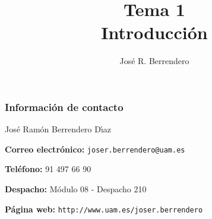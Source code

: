 \documentclass{beamer}
\title[Estad\'{\i}stica: Tema 1]{Tema 1\\
 Introducción}
\author[Berrendero]
{Jos\'{e} R. Berrendero}
\date{}
\institute{Departamento de Matem\'{a}ticas\\
 Universidad Aut\'{o}noma de Madrid}
\begin{document}
\frame{\titlepage}


\begin{frame}[plain]
\frametitle{Informaci\'{o}n de contacto}


\centerline{Jos\'{e} Ram\'{o}n
Berrendero D\'{\i}az}

\bigskip

\bigskip

\textbf{Correo electr\'{o}nico:} {\tt joser.berrendero@uam.es}

\bigskip

\textbf{Tel\'{e}fono:} 91 497 66 90

\bigskip

\textbf{Despacho:}  M\'{o}dulo 08 - Despacho 210

\bigskip

\textbf{P\'{a}gina web:} {\tt http://www.uam.es/joser.berrendero}



\end{frame}
\end{document}

